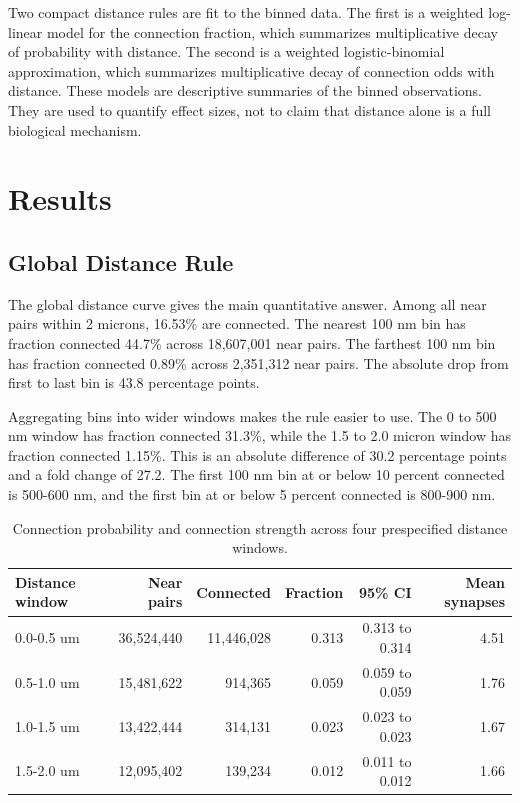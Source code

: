 \documentclass[11pt]{article}
\begin{document}
Two compact distance rules are fit to the binned data. The first is a weighted log-linear model for the connection fraction, which summarizes multiplicative decay of probability with distance. The second is a weighted logistic-binomial approximation, which summarizes multiplicative decay of connection odds with distance. These models are descriptive summaries of the binned observations. They are used to quantify effect sizes, not to claim that distance alone is a full biological mechanism.

\section{Results}

\subsection{Global Distance Rule}

The global distance curve gives the main quantitative answer. Among all near pairs within 2 microns, 16.53\% are connected. The nearest 100 nm bin has fraction connected 44.7\% across 18,607,001 near pairs. The farthest 100 nm bin has fraction connected 0.89\% across 2,351,312 near pairs. The absolute drop from first to last bin is 43.8 percentage points.

Aggregating bins into wider windows makes the rule easier to use. The 0 to 500 nm window has fraction connected 31.3\%, while the 1.5 to 2.0 micron window has fraction connected 1.15\%. This is an absolute difference of 30.2 percentage points and a fold change of 27.2. The first 100 nm bin at or below 10 percent connected is 500-600 nm, and the first bin at or below 5 percent connected is 800-900 nm.

\begin{table}[htbp]
\centering
\small
\caption{Connection probability and connection strength across four prespecified distance windows.}
\label{tab:distance-windows}
\begin{tabular}{lrrrrr}
\toprule
Distance window & Near pairs & Connected & Fraction & 95\% CI & Mean synapses \\
\midrule
0.0-0.5 um & 36,524,440 & 11,446,028 & 0.313 & 0.313 to 0.314 & 4.51 \\
0.5-1.0 um & 15,481,622 & 914,365 & 0.059 & 0.059 to 0.059 & 1.76 \\
1.0-1.5 um & 13,422,444 & 314,131 & 0.023 & 0.023 to 0.023 & 1.67 \\
1.5-2.0 um & 12,095,402 & 139,234 & 0.012 & 0.011 to 0.012 & 1.66 \\
\bottomrule
\end{tabular}
\end{table}
\end{document}
